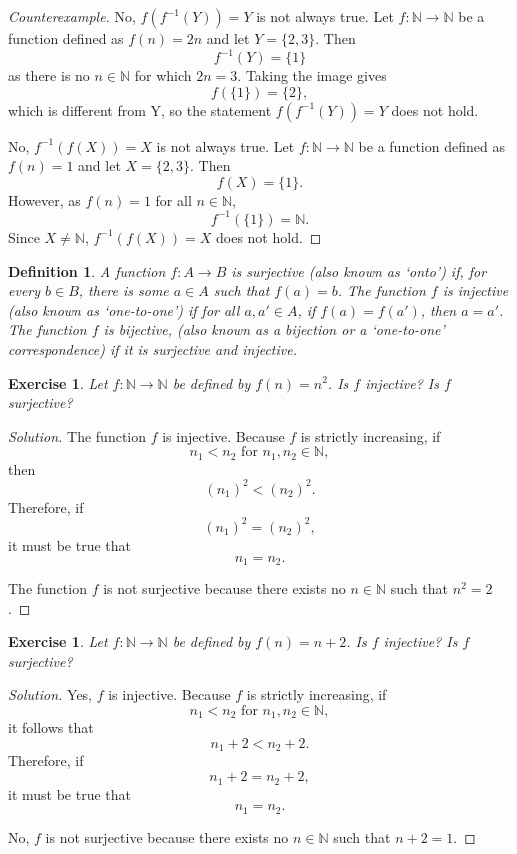 \documentclass{amsart}
\newtheorem{definition}[theorem]{Definition}
\newtheorem{exercise}[theorem]{Exercise}
\newcommand{\N}{\mathbb N}
\newcommand{\1}{\mathds{1}}
\def \N {{\mathbb {N}}}
\numberwithin{equation}{section}
\numberwithin{theorem}{section}
\begin{document}
\begin{proof}[Counterexample]
	No, $f(f^{-1}(Y))=Y$ is not always true. Let $f:\N\to\N$ be a function defined as $f(n) = 2n$ and let $Y = \{2,3\}$. Then $$f^{-1}(Y) = \{1\}$$ as there is no $n\in\N$ for which $2n=3$. Taking the image gives $$f(\{1\}) = \{2\},$$ which is different from Y, so the statement $f(f^{-1}(Y))=Y$ does not hold. 
	
	No, $f^{-1}(f(X))=X$ is not always true. Let $f:\N\to\N$ be a function defined as $f(n) = 1$ and let $X = \{2,3\}$. Then $$f(X)=\{1\}.$$ However, as $f(n)=1$ for all $n\in\N$, $$f^{-1}(\{1\})= \N.$$ Since  $X\not=\N$, $f^{-1}(f(X))=X$ does not hold. 
	
\end{proof}

\begin{definition}  A function $f \colon A \rightarrow B$ is \emph{surjective} (also known as `onto') if, 
for every $b\in B$, there is some $a\in A$ such that $f(a) = b$.  The function $f$ is \emph{injective} (also known as `one-to-one') if for all $a, a' \in A$, if $f(a) = f(a')$, then $a = a'$.  The function $f$ is \emph{bijective}, (also known as a bijection or a `one-to-one' correspondence) if it is surjective and injective.
\end{definition}

\begin{exercise}
Let $f:{\mathbb N}\rightarrow {\mathbb N}$ be defined by $f(n)=n^2$.  Is $f$ injective?  Is $f$ surjective?

\end{exercise}

\begin{proof}[Solution]
	The function $f$ is injective. Because $f$ is strictly increasing, if $$n_1<n_2 \text{ for } n_1,n_2\in\N,$$ then $$(n_1)^2<(n_2)^2.$$ Therefore, if $$(n_1)^2=(n_2)^2,$$ it must be true that $$n_1=n_2.$$ 
	
	The function $f$ is not surjective because there exists no $n\in\N$ such that $n^2 = 2$.
\end{proof}

\begin{exercise}
Let $f:{\mathbb N}\rightarrow {\mathbb N}$ be defined by $f(n)=n+2$.  Is $f$ injective?  Is $f$ surjective?

\end{exercise}

\begin{proof}[Solution]
	Yes, $f$ is injective. Because $f$ is strictly increasing, if $$n_1<n_2 \text{ for } n_1,n_2\in\N,$$ it follows that $$n_1+2<n_2+2.$$ Therefore, if $$n_1+2=n_2+2,$$ it must be true that $$n_1=n_2.$$ 
	
	No, $f$ is not surjective because there exists no $n\in\N$ such that $n+2 = 1$.
\end{proof}
\end{document}
